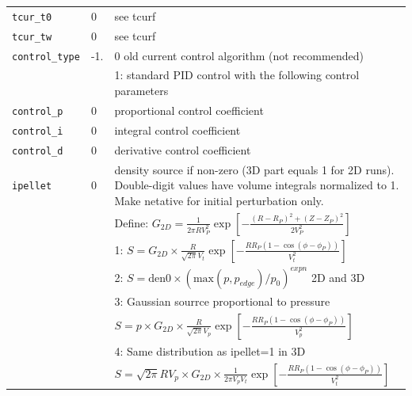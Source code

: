 \begin{tabular}{llp{4.5in}}
  \texttt{tcur\_t0}       & 0 & see tcurf \\
  \texttt{tcur\_tw}       & 0 & see tcurf \\                                       
  \texttt{control\_type}  & -1. &  0 old current control algorithm (not recommended) \\
                          &     &  1: standard PID  control with the following control parameters \\                                                        
  \texttt{control\_p}     & 0 & proportional control coefficient \\
  \texttt{control\_i}     & 0 & integral control coefficient \\                 
  \texttt{control\_d}     & 0 & derivative control coefficient  \\

  \hline
  \texttt{ipellet}      & 0    & density source if non-zero (3D part equals 1 for 2D runs).  
                                 Double-digit values have volume integrals normalized to 1.  
                                 Make netative for initial perturbation only. \\
                        &   & Define:  $G_{2D} = \frac{1}{2 \pi R  V_P^2}\exp \left[ - \frac{ (R - R_P)^2 + (Z - Z_P)^2}{2 V_P^2}
                                                                                \right]$  \\
                        &   & 1: $ S = G_{2D} \times \frac{R}{\sqrt{2 \pi}V_t} 
                                  \exp \left[- \frac{RR_P\left(1 - \cos(\phi - \phi_P)\right)}{V_t^2} \right] $  \\
                        &   & 2: $ S = \mbox{den0} \times \left( \mbox{max} (p , p_{edge} )/p_0 \right)^{expn} $ 2D and 3D \\
                        &   & 3: Gaussian sourrce proportional to pressure \\
                        &   & $ S = p \times G_{2D} \times \frac{R}{\sqrt{2 \pi}V_p}
                                  \exp \left[- \frac{RR_P\left(1 - \cos(\phi - \phi_P)\right)}{V_p^2} \right] $  \\
                        &   & 4: Same distribution as ipellet=1 in 3D \\
                        &   & $ S = \sqrt{2 \pi} R V_p \times G_{2D} \times \frac{1}{2 \pi V_p V_t}
                                  \exp \left[- \frac{RR_P\left(1 - \cos(\phi - \phi_P)\right)}{V_t^2} \right] $ 
\end{tabular}

